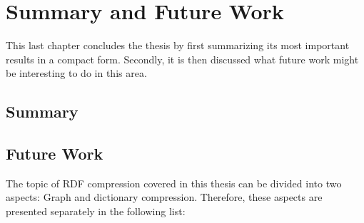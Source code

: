 \chapter{Summary and Future Work}\label{ch:summary_and_discussion}

This last chapter concludes the thesis by first summarizing its most important results in a compact form. Secondly, it is then discussed what future work might be interesting to do in this area.

\section{Summary}

\section{Future Work}

The topic of RDF compression covered in this thesis can be divided into two aspects: Graph and dictionary compression. Therefore, these aspects are presented separately in the following list:


